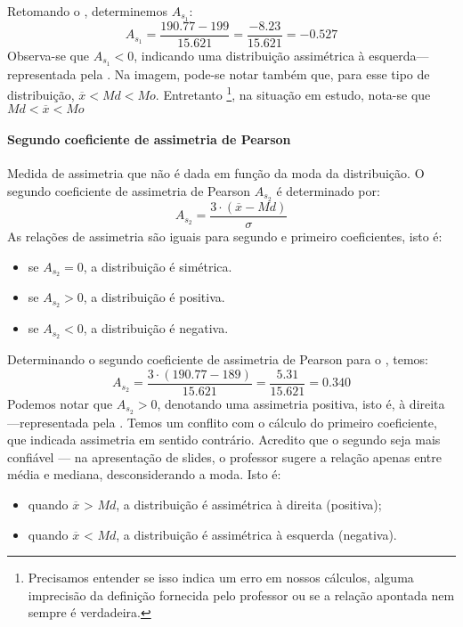 Retomando o , determinemos $A_{s_1}$:
\[
    A_{s_1} = \frac{190.77 - 199}{15.621} = \frac{-8.23}{15.621} = -0.527
\]
Observa-se que $A_{s_1}<0$, indicando uma distribuição assimétrica à
esquerda---representada pela . Na imagem, pode-se notar
também que, para esse tipo de distribuição, $\overline{x}<Md<Mo$. Entretanto
\footnote{Precisamos entender se isso indica um erro em nossos cálculos, alguma
imprecisão da definição fornecida pelo professor ou se a relação apontada nem
sempre é verdadeira.},
na situação em estudo, nota-se que $Md<\overline{x}<Mo$

\paragraph{Segundo coeficiente de assimetria de Pearson}
Medida de assimetria que não é dada em função da moda da distribuição. O
segundo coeficiente de assimetria de Pearson $A_{s_2}$ é determinado por:
\begin{equation}
    A_{s_2} = \frac{3 \cdot (\overline{x} - Md)}{\sigma}
    \label{eq:seg-coef-ass-pearson}
\end{equation}
As relações de assimetria são iguais para segundo e primeiro coeficientes, isto
é:
\begin{itemize}
    \item se $A_{s_2}=0$, a distribuição é simétrica.
    \item se $A_{s_2}>0$, a distribuição é positiva.
    \item se $A_{s_2}<0$, a distribuição é negativa.
\end{itemize}
Determinando o segundo coeficiente de assimetria de Pearson para o
, temos:
\[
    A_{s_2} = \frac{3 \cdot (190.77-189)}{15.621} = \frac{5.31}{15.621} = 0.340
\]
Podemos notar que $A_{s_2}>0$, denotando uma assimetria positiva, isto é, à
direita---representada pela . Temos um conflito com o
cálculo do primeiro coeficiente, que indicada assimetria em sentido contrário.
Acredito que o segundo seja mais confiável --- na apresentação de slides, o
professor sugere a relação apenas entre média e mediana, desconsiderando a
moda. Isto é:
\begin{itemize}
    \item quando $\overline{x}$ > $Md$, a distribuição é assimétrica à direita
    (positiva);
    \item quando $\overline{x}$ < $Md$, a distribuição é assimétrica à esquerda
    (negativa).
\end{itemize}

